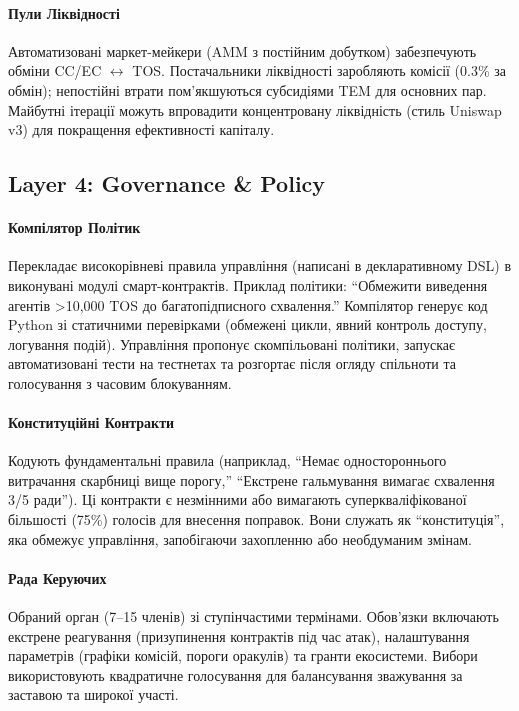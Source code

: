 \documentclass[11pt]{article}
\begin{document}
\paragraph{Пули Ліквідності} Автоматизовані маркет-мейкери (AMM з постійним добутком) забезпечують обміни CC/EC $\leftrightarrow$ TOS. Постачальники ліквідності заробляють комісії (0.3\% за обмін); непостійні втрати пом'якшуються субсидіями TEM для основних пар. Майбутні ітерації можуть впровадити концентровану ліквідність (стиль Uniswap v3) для покращення ефективності капіталу.

\subsection{Layer 4: Governance \& Policy}
\paragraph{Компілятор Політик} Перекладає високорівневі правила управління (написані в декларативному DSL) в виконувані модулі смарт-контрактів. Приклад політики: ``Обмежити виведення агентів >10,000 TOS до багатопідписного схвалення.'' Компілятор генерує код Python зі статичними перевірками (обмежені цикли, явний контроль доступу, логування подій). Управління пропонує скомпільовані політики, запускає автоматизовані тести на тестнетах та розгортає після огляду спільноти та голосування з часовим блокуванням.

\paragraph{Конституційні Контракти} Кодують фундаментальні правила (наприклад, ``Немає одностороннього витрачання скарбниці вище порогу,'' ``Екстрене гальмування вимагає схвалення 3/5 ради''). Ці контракти є незмінними або вимагають суперкваліфікованої більшості (75\%) голосів для внесення поправок. Вони служать як ``конституція'', яка обмежує управління, запобігаючи захопленню або необдуманим змінам.

\paragraph{Рада Керуючих} Обраний орган (7--15 членів) зі ступінчастими термінами. Обов'язки включають екстрене реагування (призупинення контрактів під час атак), налаштування параметрів (графіки комісій, пороги оракулів) та гранти екосистеми. Вибори використовують квадратичне голосування для балансування зважування за заставою та широкої участі.
\end{document}
